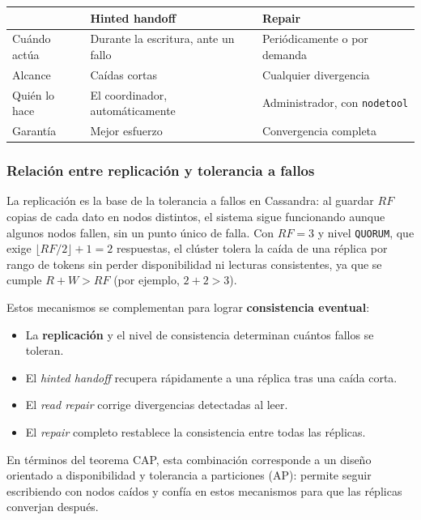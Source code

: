 \documentclass[11pt,a4paper]{article}
\begin{document}
\begin{center}
\begin{tabular}{@{}lll@{}}
\toprule
 & \textbf{Hinted handoff} & \textbf{Repair} \\
\midrule
Cuándo actúa & Durante la escritura, ante un fallo & Periódicamente o por demanda \\
Alcance & Caídas cortas & Cualquier divergencia \\
Quién lo hace & El coordinador, automáticamente & Administrador, con \texttt{nodetool} \\
Garantía & Mejor esfuerzo & Convergencia completa \\
\bottomrule
\end{tabular}
\end{center}

\subsubsection{Relación entre replicación y tolerancia a fallos}

La replicación es la base de la tolerancia a fallos en Cassandra: al guardar $RF$ copias de cada dato en nodos distintos, el sistema sigue funcionando aunque algunos nodos fallen, sin un punto único de falla. Con $RF=3$ y nivel \texttt{QUORUM}, que exige $\lfloor RF/2 \rfloor + 1 = 2$ respuestas, el clúster tolera la caída de una réplica por rango de tokens sin perder disponibilidad ni lecturas consistentes, ya que se cumple $R + W > RF$ (por ejemplo, $2 + 2 > 3$).

Estos mecanismos se complementan para lograr \textbf{consistencia eventual}:
\begin{itemize}[nosep]
  \item La \textbf{replicación} y el nivel de consistencia determinan cuántos fallos se toleran.
  \item El \textit{hinted handoff} recupera rápidamente a una réplica tras una caída corta.
  \item El \textit{read repair} corrige divergencias detectadas al leer.
  \item El \textit{repair} completo restablece la consistencia entre todas las réplicas.
\end{itemize}

En términos del teorema CAP, esta combinación corresponde a un diseño orientado a disponibilidad y tolerancia a particiones (AP): permite seguir escribiendo con nodos caídos y confía en estos mecanismos para que las réplicas converjan después.
\end{document}
